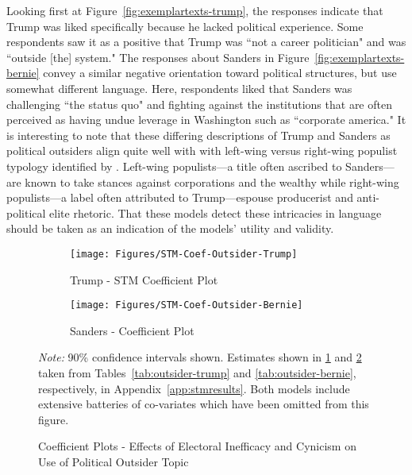 \documentclass[12pt]{article}
\begin{document}
Looking first at Figure~\ref{fig:exemplartexts-trump}, the responses indicate that Trump was liked specifically because he lacked political experience. Some respondents saw it as a positive that Trump was ``not a career politician" and was ``outside [the] system." The responses about Sanders in Figure~\ref{fig:exemplartexts-bernie} convey a similar negative orientation toward political structures, but use somewhat different language. Here, respondents liked that Sanders was challenging ``the status quo" and fighting against the institutions that are often perceived as having undue leverage in Washington such as ``corporate america." It is interesting to note that these differing descriptions of Trump and Sanders as political outsiders align quite well with with left-wing versus right-wing populist typology identified by \textcite{lacatus2021populism}. Left-wing populists---a title often ascribed to Sanders---are known to take stances against corporations and the wealthy while right-wing populists---a label often attributed to Trump---espouse producerist and anti-political elite rhetoric. That these models detect these intricacies in language should be taken as an indication of the models' utility and validity. 


\begin{figure}[t!]
\centering
   \begin{subfigure}[b]{0.45\textwidth}
	   \centering
	   \texttt{[image: Figures/STM-Coef-Outsider-Trump]}
	   \caption{{\small Trump - STM Coefficient  Plot}}
	   \label{fig:coefplot-stm-trump} 
	\end{subfigure}
   \begin{subfigure}[b]{0.45\textwidth}
	   \centering
	   \texttt{[image: Figures/STM-Coef-Outsider-Bernie]}
	   \caption{{\small Sanders - Coefficient  Plot}}
	   \label{fig:coefplot-stm-bernie} 
	\end{subfigure}
	\caption{Coefficient Plots - Effects of Electoral Inefficacy and Cynicism on Use of Political Outsider Topic}\label{fig:coefplot-stm}
	\vspace{-.25cm}
	    \vspace{-0.25cm}
    {\scriptsize \textit{Note:} 90\% confidence intervals shown. Estimates shown in \ref{fig:coefplot-stm-trump} and \ref{fig:coefplot-stm-bernie} taken from Tables~\ref{tab:outsider-trump} and \ref{tab:outsider-bernie}, respectively, in Appendix~\ref{app:stmresults}. Both models include extensive batteries of co-variates which have been omitted from this figure. }
\end{figure}
\end{document}
